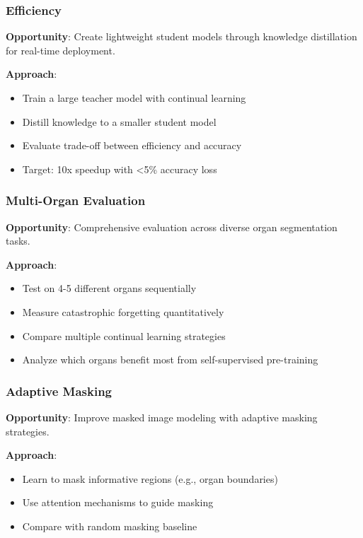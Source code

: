 \documentclass[conference]{IEEEtran}
\begin{document}
\subsubsection{Efficiency}

\textbf{Opportunity}: Create lightweight student models through knowledge distillation for real-time deployment.

\textbf{Approach}:
\begin{itemize}
    \item Train a large teacher model with continual learning
    \item Distill knowledge to a smaller student model
    \item Evaluate trade-off between efficiency and accuracy
    \item Target: 10x speedup with <5\% accuracy loss
\end{itemize}

\subsubsection{Multi-Organ Evaluation}

\textbf{Opportunity}: Comprehensive evaluation across diverse organ segmentation tasks.

\textbf{Approach}:
\begin{itemize}
    \item Test on 4-5 different organs sequentially
    \item Measure catastrophic forgetting quantitatively
    \item Compare multiple continual learning strategies
    \item Analyze which organs benefit most from self-supervised pre-training
\end{itemize}

\subsubsection{Adaptive Masking}

\textbf{Opportunity}: Improve masked image modeling with adaptive masking strategies.

\textbf{Approach}:
\begin{itemize}
    \item Learn to mask informative regions (e.g., organ boundaries)
    \item Use attention mechanisms to guide masking
    \item Compare with random masking baseline
\end{itemize}
\end{document}
